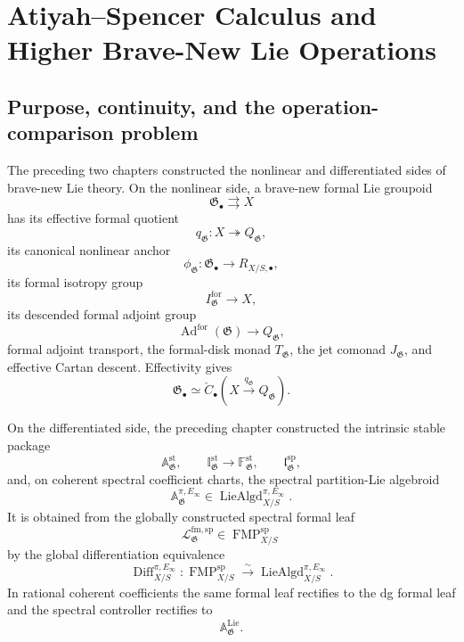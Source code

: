 \chapter{Atiyah--Spencer Calculus and Higher Brave-New Lie Operations}
\label{ch:atiyah-spencer}

\section{Purpose, continuity, and the operation-comparison problem}
\label{sec:as-purpose}

The preceding two chapters constructed the nonlinear and differentiated sides
of brave-new Lie theory.  On the nonlinear side, a brave-new formal Lie
groupoid
\[
    \mathfrak G_\bullet\rightrightarrows X
\]
has its effective formal quotient
\[
    q_{\mathfrak G}:X\twoheadrightarrow Q_{\mathfrak G},
\]
its canonical nonlinear anchor
\[
    \phi_{\mathfrak G}:
    \mathfrak G_\bullet\longrightarrow R_{X/S,\bullet},
\]
its formal isotropy group
\[
    I^{\mathrm{for}}_{\mathfrak G}\longrightarrow X,
\]
its descended formal adjoint group
\[
    \operatorname{Ad}^{\mathrm{for}}(\mathfrak G)
    \longrightarrow Q_{\mathfrak G},
\]
formal adjoint transport, the formal-disk monad $T_{\mathfrak G}$, the jet
comonad $J_{\mathfrak G}$, and effective Cartan descent.  Effectivity gives
\[
    \mathfrak G_\bullet
    \simeq
    \check C_\bullet
    \left(
        X\xrightarrow{q_{\mathfrak G}}Q_{\mathfrak G}
    \right).
\]

On the differentiated side, the preceding chapter constructed the intrinsic
stable package
\[
    \mathbb A^{\mathrm{st}}_{\mathfrak G},
    \qquad
    \mathbb I^{\mathrm{st}}_{\mathfrak G}
    \longrightarrow
    \mathbb F^{\mathrm{st}}_{\mathfrak G},
    \qquad
    \mathfrak l^{\mathrm{sp}}_{\mathfrak G},
\]
and, on coherent spectral coefficient charts, the spectral partition-Lie
algebroid
\[
    \mathbb A^{\pi,E_\infty}_{\mathfrak G}
    \in
    \operatorname{LieAlgd}^{\pi,E_\infty}_{X/S}.
\]
It is obtained from the globally constructed spectral formal leaf
\[
    \mathcal L^{\mathrm{fm,sp}}_{\mathfrak G}
    \in
    \operatorname{FMP}^{\mathrm{sp}}_{X/S}
\]
by the global differentiation equivalence
\[
    \operatorname{Diff}^{\pi,E_\infty}_{X/S}:
    \operatorname{FMP}^{\mathrm{sp}}_{X/S}
    \xrightarrow{\sim}
    \operatorname{LieAlgd}^{\pi,E_\infty}_{X/S}.
\]
In rational coherent coefficients the same formal leaf rectifies to the dg
formal leaf and the spectral controller rectifies to
\[
    \mathbb A^{\mathrm{Lie}}_{\mathfrak G}.
\]

